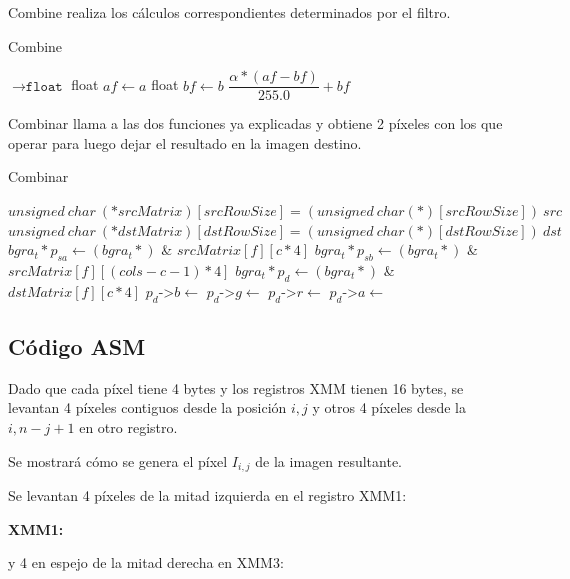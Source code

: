 \par{Combine realiza los cálculos correspondientes determinados por el filtro.}
\begin{algorithm}[h!]
\caption{Combine}
\begin{algorithmic}
    $\to \texttt{float}$
	\State float $af \gets a$
	\State float $bf \gets b$
	\State \Return $\dfrac{\alpha * (af - bf)}{255.0} + bf$
\EndFunction
\end{algorithmic} 
\end{algorithm}

\par{Combinar llama a las dos funciones ya explicadas y obtiene 2 píxeles con los que operar para luego dejar el resultado en la imagen destino.}
\begin{algorithm}[h!]
\caption{Combinar}
\begin{algorithmic}
	\State $unsigned~ char~ (*srcMatrix)[srcRowSize] = (unsigned~ char (*)[srcRowSize])~ src$
	\State $unsigned~ char~ (*dstMatrix)[dstRowSize] = (unsigned~ char (*)[dstRowSize])~ dst$
			\State $bgra_t* p_{sa} \gets (bgra_t*)$ \& $srcMatrix[f][c * 4]$
			\State $bgra_t* p_{sb} \gets (bgra_t*)$ \&$srcMatrix[f][(cols - c -1) * 4]$
			\State $bgra_t *p_d \gets (bgra_t*)$ \&$dstMatrix[f][c * 4]$
			\State $p_d$->$b \gets$ 
			\State $p_d$->$g \gets$ 
			\State $p_d$->$r \gets$ 
			\State $p_d$->$a \gets$ 
		\EndFor
	\EndFor
\EndFunction
\end{algorithmic} 
\end{algorithm}
	
\subsection{Código ASM}
\par{Dado que cada píxel tiene 4 bytes y los registros XMM tienen 16 bytes, se levantan 4 píxeles contiguos desde la posición $i,j$ y otros 4 píxeles desde la $i, n-j+1$ en otro registro.}
\par{Se mostrará cómo se genera el píxel $I_{i,j}$ de la imagen resultante.}
\par{Se levantan 4 píxeles de la mitad izquierda en el registro XMM1:}
\par{\textbf{XMM1:}}
\par{y 4 en espejo de la mitad derecha en XMM3:}

